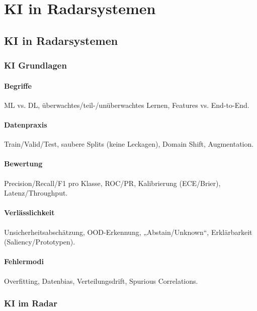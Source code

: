 \part{KI in Radarsystemen}
\chapter{KI in Radarsystemen}

\section{KI Grundlagen}

\subsection{Begriffe}
ML vs. DL, überwachtes/teil-/unüberwachtes Lernen, Features vs. End-to-End.

\subsection{Datenpraxis}
Train/Valid/Test, saubere Splits (keine Leckagen), Domain Shift, Augmentation.

\subsection{Bewertung}
Precision/Recall/F1 pro Klasse, ROC/PR, Kalibrierung (ECE/Brier), Latenz/Throughput.

\subsection{Verlässlichkeit}
Unsicherheitsabschätzung, OOD-Erkennung, „Abstain/Unknown“, Erklärbarkeit (Saliency/Prototypen).

\subsection{Fehlermodi}
Overfitting, Datenbias, Verteilungsdrift, Spurious Correlations.




\section{KI im Radar}

